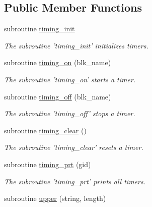 \subsection*{Public Member Functions}
\begin{DoxyCompactItemize}
\item 
subroutine \hyperlink{classfv__timing__mod_a9e0e76eea1b67592c8ec6edd35d2f9f9}{timing\-\_\-init}
\begin{DoxyCompactList}\small\item\em The subroutine 'timing\-\_\-init' initializes timers. \end{DoxyCompactList}\item 
subroutine \hyperlink{classfv__timing__mod_a85fb4c4c6b3d9604bb682356ab3e7a82}{timing\-\_\-on} (blk\-\_\-name)
\begin{DoxyCompactList}\small\item\em The subroutine 'timing\-\_\-on' starts a timer. \end{DoxyCompactList}\item 
subroutine \hyperlink{classfv__timing__mod_ad40e8855859ae4d87ac63985163a1c3d}{timing\-\_\-off} (blk\-\_\-name)
\begin{DoxyCompactList}\small\item\em The subroutine 'timing\-\_\-off' stops a timer. \end{DoxyCompactList}\item 
subroutine \hyperlink{classfv__timing__mod_afa9b6547732c567cedd45cc80bf6ab5a}{timing\-\_\-clear} ()
\begin{DoxyCompactList}\small\item\em The subroutine 'timing\-\_\-clear' resets a timer. \end{DoxyCompactList}\item 
subroutine \hyperlink{classfv__timing__mod_aa878226a27afbc94a821f2f475653d7d}{timing\-\_\-prt} (gid)
\begin{DoxyCompactList}\small\item\em The subroutine 'timing\-\_\-prt' prints all timers. \end{DoxyCompactList}\item 
subroutine \hyperlink{classfv__timing__mod_a916b4aea50b8b2d26b06c2bbc96d3564}{upper} (string, length)
\end{DoxyCompactItemize}
